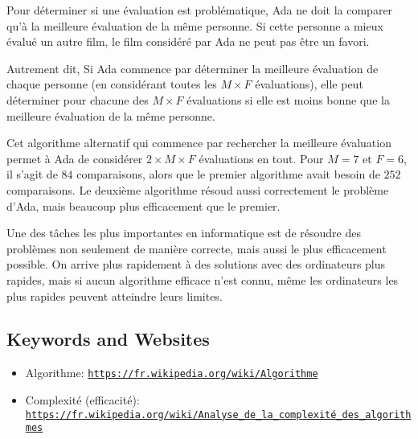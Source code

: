 \documentclass[a4paper,11pt]{report}
\newcommand{\BrochureUrlText}[1]{\texttt{#1}}
\begin{document}
Pour déterminer si une évaluation est problématique, Ada ne doit la comparer qu’à la meilleure évaluation de la même personne. Si cette personne a mieux évalué un autre film, le film considéré par Ada ne peut pas être un favori.

Autrement dit, Si Ada commence par déterminer la meilleure évaluation de chaque personne (en considérant toutes les ${M \times F}$ évaluations), elle peut déterminer pour chacune des ${M \times F}$ évaluations si elle est moins bonne que la meilleure évaluation de la même personne.

Cet algorithme alternatif qui commence par rechercher la meilleure évaluation permet à Ada de considérer ${2 \times M \times F}$ évaluations en tout. Pour ${M=7}$ et ${F=6}$, il s’agit de $84$ comparaisons, alors que le premier algorithme avait besoin de $252$ comparaisons. Le deuxième algorithme résoud aussi correctement le problème d’Ada, mais beaucoup plus efficacement que le premier.

Une des tâches les plus importantes en informatique est de résoudre des problèmes non seulement de manière correcte, mais aussi le plus efficacement possible. On arrive plus rapidement à des solutions avec des ordinateurs plus rapides, mais si aucun algorithme efficace n’est connu, même les ordinateurs les plus rapides peuvent atteindre leurs limites.

{\raggedright

\subsection*{Keywords and Websites}

\begin{itemize}
  \item Algorithme: \href{https://fr.wikipedia.org/wiki/Algorithme}{\BrochureUrlText{https://fr.wikipedia.org/wiki/Algorithme}}
  \item Complexité (efficacité): \href{https://fr.wikipedia.org/wiki/Analyse_de_la_complexit\%C3\%A9_des_algorithmes}{\BrochureUrlText{https://fr.wikipedia.org/wiki/Analyse\_de\_la\_complexité\_des\_algorithmes}}
\end{itemize}


}
\end{document}
